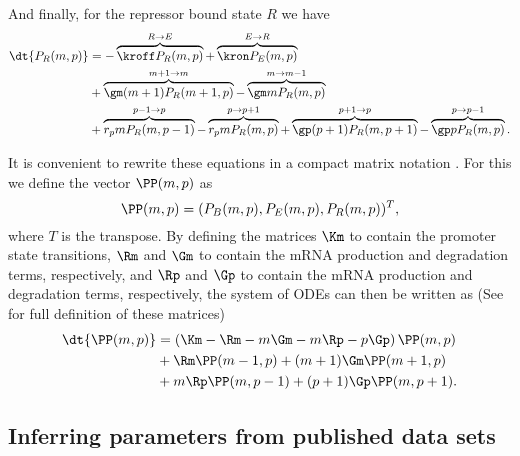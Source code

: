 And finally, for the repressor bound state $R$ we have
\begin{equation}
  \begin{aligned}
    \dt{P_R(m, p)} &=
    - \overbrace{\kroff P_R(m, p)}^{R \rightarrow E} %
    + \overbrace{\kron P_E(m, p)}^{E \rightarrow R}\\ %
    &+ \overbrace{\gm (m + 1) P_R(m+1 , p)}^{m+1 \rightarrow m} %
    - \overbrace{\gm m P_R(m , p)}^{m \rightarrow m-1}\\ %
    &+ \overbrace{r_p m P_R(m, p - 1)}^{p-1 \rightarrow p} %
    - \overbrace{r_p m P_R(m, p)}^{p \rightarrow p+1} %
    + \overbrace{\gp (p + 1) P_R(m, p + 1)}^{p + 1 \rightarrow p} %
    - \overbrace{\gp p P_R(m, p)}^{p \rightarrow p-1}. %
  \end{aligned}
\end{equation}

It is convenient to rewrite these equations in a compact matrix notation
\cite{Sanchez2013}. For this we define the vector $\PP(m, p)$ as
\begin{equation}
  \PP(m, p) = (P_B(m, p), P_E(m, p), P_R(m, p))^T,
\end{equation}
where $T$ is the transpose. By defining the matrices $\Km$ to contain the
promoter state transitions, $\Rm$ and $\Gm$ to contain the mRNA production and
degradation terms, respectively, and $\Rp$ and $\Gp$ to contain the mRNA
production and degradation terms, respectively, the system of ODEs can then be
written as (See  for full definition of these matrices)
\begin{equation}
  \begin{aligned}
    \dt{\PP(m, p)} &= \left( \Km -\Rm -m\Gm -m\Rp -p\Gp \right) \PP(m, p)\\
    &+ \Rm \PP(m-1, p)
    + (m + 1) \Gm \PP(m + 1, p)\\
    &+ m \Rp \PP(m, p - 1)
    + (p + 1) \Gp \PP(m, p + 1).
  \end{aligned}
  \label{eq_cme_matrix}
\end{equation}

\subsection{Inferring parameters from published data sets}

